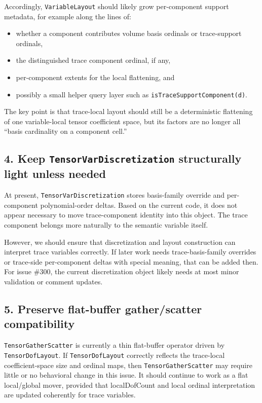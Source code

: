\documentclass[11pt]{article}
\begin{document}
Accordingly, \texttt{VariableLayout} should likely grow per-component support metadata, for example along the lines of:
\begin{itemize}[leftmargin=2em]
  \item whether a component contributes volume basis ordinals or trace-support ordinals,
  \item the distinguished trace component ordinal, if any,
  \item per-component extents for the local flattening, and
  \item possibly a small helper query layer such as \texttt{isTraceSupportComponent(d)}.
\end{itemize}

The key point is that trace-local layout should still be a deterministic flattening of one variable-local tensor coefficient space, but its factors are no longer all ``basis cardinality on a component cell.''

\subsection{4. Keep \texttt{TensorVarDiscretization} structurally light unless needed}

At present, \texttt{TensorVarDiscretization} stores basis-family override and per-component polynomial-order deltas. Based on the current code, it does not appear necessary to move trace-component identity into this object. The trace component belongs more naturally to the semantic variable itself.

However, we should ensure that discretization and layout construction can interpret trace variables correctly. If later work needs trace-basis-family overrides or trace-side per-component deltas with special meaning, that can be added then. For issue \#300, the current discretization object likely needs at most minor validation or comment updates.

\subsection{5. Preserve flat-buffer gather/scatter compatibility}

\texttt{TensorGatherScatter} is currently a thin flat-buffer operator driven by \texttt{TensorDofLayout}. If \texttt{TensorDofLayout} correctly reflects the trace-local coefficient-space size and ordinal maps, then \texttt{TensorGatherScatter} may require little or no behavioral change in this issue. It should continue to work as a flat local/global mover, provided that localDofCount and local ordinal interpretation are updated coherently for trace variables.
\end{document}
